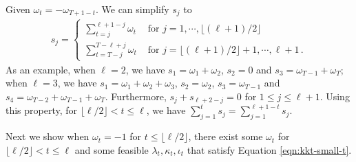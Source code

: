         Given $\omega_t = - \omega_{T+1-t}$. We can simplify $s_j$  to
			\begin{eqnarray*}
				s_j = \begin{cases} 
					\sum_{t = j}^{\ell+1-j} \omega_t & \text{ for } j = 1, \cdots, \lfloor (\ell+1)/2 \rfloor \\
					\sum_{t = T-j}^{T - \ell+j} \omega_t & \text{ for } j = \lfloor (\ell+1)/2 \rfloor+1, \cdots, \ell+1 \, .  
				\end{cases}
			\end{eqnarray*}
			As an example, when $\ell = 2$,  we have $s_1 = \omega_1 + \omega_2$, $s_2 = 0$ and $s_3 = \omega_{T-1}+\omega_T$; when $\ell = 3$,  we have $s_1 = \omega_1 + \omega_2 + \omega_3$, $s_2 = \omega_2$, $s_3 = \omega_{T-1}$ and  $s_4 = \omega_{T-2}+\omega_{T-1}+\omega_T$. Furthermore, $s_j + s_{\ell+2-j} = 0$ for $1 \leq j \leq  \ell+1$. Using this property, for $\lfloor \ell/2 \rfloor < t \leq \ell$, we have $\sum_{j = 1}^t s_j = \sum_{j = 1}^{\ell+1-t} s_j$.
			
			Next we show when $ \omega_t = -1$ for $t \leq \lfloor \ell/2 \rfloor$, there exist some $\omega_t$  for $ \lfloor \ell/2 \rfloor < t \leq \ell$ and some feasible $\lambda_t, \kappa_t, \iota_t$ that satisfy Equation \eqref{eqn:kkt-small-t}. 
			
